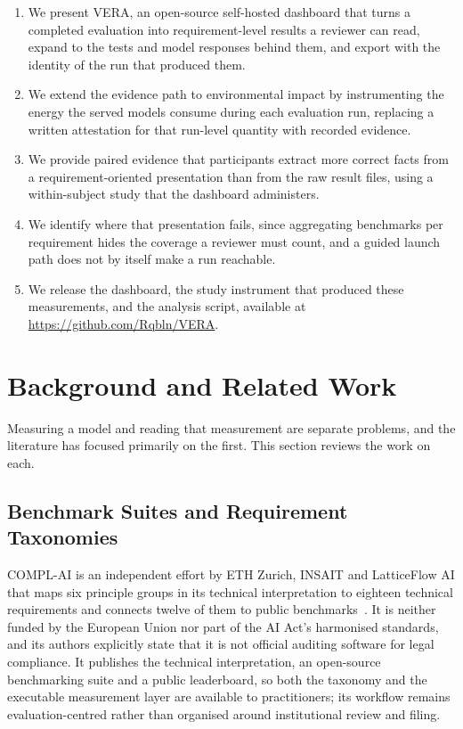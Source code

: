 \documentclass[10pt,conference]{IEEEtran}
\providecommand{\repourl}{https://github.com/Rqbln/VERA}
\begin{document}
\begin{enumerate}
   \item We present VERA, an open-source self-hosted dashboard that turns a completed evaluation into requirement-level results a reviewer can read, expand to the tests and model responses behind them, and export with the identity of the run that produced them.
  \item We extend the evidence path to environmental impact by instrumenting the energy the served models consume during each evaluation run, replacing a written attestation for that run-level quantity with recorded evidence.
  \item We provide paired evidence that participants extract more correct facts from a requirement-oriented presentation than from the raw result files, using a within-subject study that the dashboard administers.
  \item We identify where that presentation fails, since aggregating benchmarks per requirement hides the coverage a reviewer must count, and a guided launch path does not by itself make a run reachable.
  \item We release the dashboard, the study instrument that produced these measurements, and the analysis script, available at \url{\repourl}.
\end{enumerate}

\clearpage
\section{Background and Related Work}
\label{sec:background}

Measuring a model and reading that measurement are separate problems, and the literature has focused primarily on the first.
This section reviews the work on each.

\subsection{Benchmark Suites and Requirement Taxonomies}
COMPL-AI is an independent effort by ETH Zurich, INSAIT and LatticeFlow AI that maps six principle groups in its technical interpretation to eighteen technical requirements and connects twelve of them to public benchmarks~\cite{guldimann2024complai}.
It is neither funded by the European Union nor part of the AI Act's harmonised standards, and its authors explicitly state that it is not official auditing software for legal compliance.
It publishes the technical interpretation, an open-source benchmarking suite and a public leaderboard, so both the taxonomy and the executable measurement layer are available to practitioners; its workflow remains evaluation-centred rather than organised around institutional review and filing.
\end{document}
